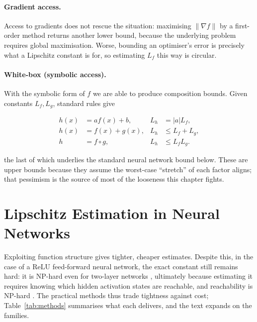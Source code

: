 \paragraph{Gradient access.} Access to gradients does not rescue the situation: maximising $\|\nabla f\|$ by a first-order method returns another lower bound, because the underlying problem requires global maximisation. Worse, bounding an optimiser's error is precisely what a Lipschitz constant is for, so estimating $L_f$ this way is circular.

\paragraph{White-box (symbolic access).} With the symbolic form of $f$ we are able to produce composition bounds. Given constants $L_f,L_g$, standard rules give

\begin{align}
    h(x) &= a f(x) + b,          & L_h &= |a|L_f, \label{eq:lipschitz-affine}\\
    h(x) &= f(x) + g(x),         & L_h &\le L_f + L_g, \label{eq:lipschitz-sum}\\
    h    &= f \circ g,           & L_h &\le L_fL_g. \label{eq:lipschitz-composition}
\end{align}

the last of which underlies the standard neural network bound below. These are upper bounds because they assume the worst-case ``stretch'' of each factor aligns; that pessimism is the source of most of the looseness this chapter fights.

\section{Lipschitz Estimation in Neural Networks}
\label{sec:nn_estimation}

Exploiting function structure gives tighter, cheaper estimates. Despite this, in the case of a $\mathrm{ReLU}$ feed-forward neural network, the exact constant still remains hard: it is NP-hard even for two-layer networks \cite{virmaux2018lipschitz}, ultimately because estimating it requires knowing which hidden activation states are reachable, and reachability is NP-hard \cite{kuang2026demystifying}. The practical methods thus trade tightness against cost; Table~\ref{tab:methods} summarises what each delivers, and the text expands on the families.

